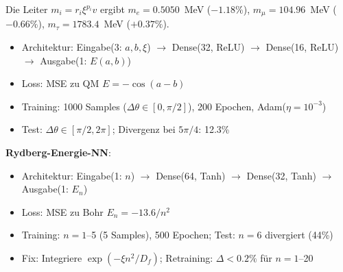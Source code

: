 	\begin{table}[htbp]
		\centering
		\caption{T0 vs.~Standardmodell: Vorhersagepräzision}
	\end{table}
	Die Leiter $m_i = r_i\xi^{p_i}v$ ergibt $m_e = 0.5050$~MeV ($-1.18\%$), $m_\mu = 104.96$~MeV ($-0.66\%$), $m_\tau = 1783.4$~MeV ($+0.37\%$).
	
	
	\begin{itemize}
		\item Architektur: Eingabe(3: $a, b, \xi$) $\to$ Dense(32, ReLU) $\to$ Dense(16, ReLU) $\to$ Ausgabe(1: $E(a,b)$)
		\item Loss: MSE zu QM $E=-\cos(a-b)$
		\item Training: 1000 Samples ($\Delta\theta \in [0,\pi/2]$), 200 Epochen, Adam($\eta=10^{-3}$)
		\item Test: $\Delta\theta \in [\pi/2, 2\pi]$; Divergenz bei $5\pi/4$: 12.3\%
	\end{itemize}
	
	\textbf{Rydberg-Energie-NN}:
	\begin{itemize}
		\item Architektur: Eingabe(1: $n$) $\to$ Dense(64, Tanh) $\to$ Dense(32, Tanh) $\to$ Ausgabe(1: $E_n$)
		\item Loss: MSE zu Bohr $E_n = -13.6/n^2$
		\item Training: $n=1$--5 (5 Samples), 500 Epochen; Test: $n=6$ divergiert (44\%)
		\item Fix: Integriere $\exp(-\xi n^2/D_f)$; Retraining: $\Delta<0.2\%$ für $n=1$--20
	\end{itemize}
	
